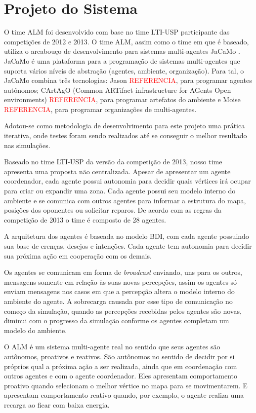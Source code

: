 \documentclass{llncs}
\begin{document}
\section{Projeto do Sistema}

O time ALM foi desenvolvido com base no time LTI-USP participante das competições de 2012 e 2013. O time ALM, assim como o time em que é baseado, utiliza o arcabouço de desenvolvimento para sistemas multi-agentes JaCaMo \cite{jacamo-scp78}. JaCaMo é uma plataforma para a programação de sistemas multi-agentes que suporta vários níveis de abstração (agentes, ambiente, organização). Para tal, o JaCaMo combina três tecnologias: Jason \textcolor{red}{REFERENCIA}, para programar agentes autônomos; CArtAgO (Common ARTifact infrastructure for AGents Open environments) \textcolor{red}{REFERENCIA}, para programar artefatos do ambiente e Moise \textcolor{red}{REFERENCIA}, para programar organizações de multi-agentes.

Adotou-se como metodologia de desenvolvimento para este projeto uma prática iterativa, onde testes foram sendo realizados até se conseguir o melhor resultado nas simulações.

Baseado no time LTI-USP da versão da competição de 2013, nosso time apresenta uma proposta não centralizada. Apesar de apresentar um agente coordenador, cada agente possui autonomia para decidir quais vértices irá ocupar para criar ou expandir uma zona. Cada agente possui seu modelo interno do ambiente e se comunica com outros agentes para informar a estrutura do mapa, posições dos oponentes ou solicitar reparos. De acordo com as regras da competição de 2013 o time é composto de 28 agentes.

A arquitetura dos agentes é baseada no modelo BDI, com cada agente possuindo sua base de crenças, desejos e intenções. Cada agente tem autonomia para decidir sua próxima ação em cooperação com os demais.

Os agentes se comunicam em forma de \textit{broadcast} enviando, uns para os outros, mensagens somente em relação às suas novas percepções, assim os agentes só enviam mensagens nos casos em que a percepção altera o modelo interno do ambiente do agente. A sobrecarga causada por esse tipo de comunicação no começo da simulação, quando as percepções recebidas pelos agentes são novas, diminui com o progresso da simulação conforme os agentes completam um modelo do ambiente.

O ALM é um sistema multi-agente real no sentido que seus agentes são autônomos, proativos e reativos. São autônomos no sentido de decidir por si próprios qual a próxima ação a ser realizada, ainda que em coordenação com outros agentes e com o agente coordenador. Eles apresentam comportamento proativo quando selecionam o melhor vértice no mapa para se movimentarem. E apresentam comportamento reativo quando, por exemplo, o agente realiza uma recarga ao ficar com baixa energia.
\end{document}
